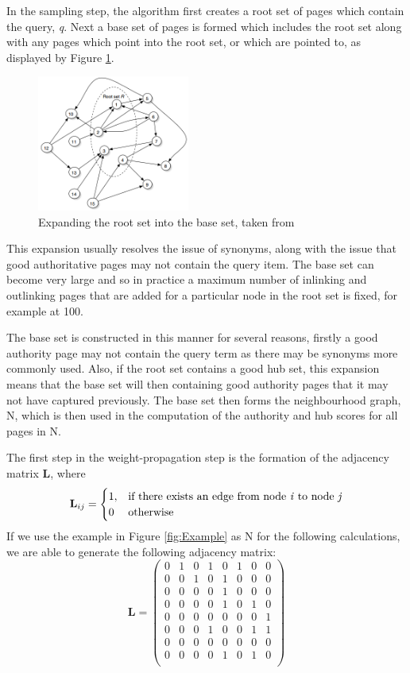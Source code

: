 \documentclass[11pt]{report}
\begin{document}
In the sampling step, the algorithm first creates a root set of pages which contain the query, \textit{q}. Next a base set of pages is formed which includes the root set along with any pages which point into the root set, or which are pointed to, as displayed by Figure \ref{fig:HITS expanding}. 
\begin{figure}[h]
\centering
\includegraphics[width=5cm]{expand_baldi.png}
\caption{Expanding the root set into the base set, taken from \cite{baldi2003modeling}}
\label{fig:HITS expanding}
\end{figure}
This expansion usually resolves the issue of synonyms, along with the issue that good authoritative pages may not contain the query item. The base set can become very large and so in practice a maximum number of inlinking and outlinking pages that are added for a particular node in the root set is fixed, for example at 100. 

The base set is constructed in this manner for several reasons, firstly a good authority page may not contain the query term  as there may be synonyms more commonly used. Also, if the root set contains a good hub set, this expansion means that the base set will then containing good authority pages that it may not have captured previously. The base set then forms the neighbourhood graph, N, which is then used in the computation of the authority and hub scores for all pages in N.


The first step in the weight-propagation step is the formation of the adjacency matrix \textbf{L}, where \[\textbf{L}_{ij} = \begin{cases} 1, & \textnormal{if there exists an edge from node \textit{i} to node \textit{j}}\\ 0 & \textnormal{otherwise}
\end{cases}\]
If we use the example in Figure \ref{fig:Example} as N for the following calculations, we are able to generate the following adjacency matrix:
\begin{equation*}
\textbf{L}=\left(
\begin{array}{cccccccc}
0 & 1 & 0 & 1 & 0 & 1 & 0 & 0 \\
0 & 0 & 1 & 0 & 1 & 0 & 0 & 0 \\
0 & 0 & 0 & 0 & 1 & 0 & 0 & 0 \\
0 & 0 & 0 & 0 & 1 & 0 & 1 & 0 \\
0 & 0 & 0 & 0 & 0 & 0 & 0 & 1 \\
0 & 0 & 0 & 1 & 0 & 0 & 1 & 1 \\
0 & 0 & 0 & 0 & 0 & 0 & 0 & 0 \\
0 & 0 & 0 & 0 & 1 & 0 & 1 & 0 \\
\end{array}
\right)
\end{equation*} 
\end{document}
